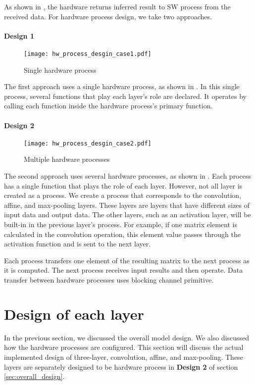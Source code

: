As shown in , the hardware returns inferred result to SW process from the received data. For hardware process design, we take two approaches.

\paragraph{Design 1}

\begin{figure}[tbp]
  \centering
  \texttt{[image: hw\_process\_desgin\_case1.pdf]}
  \caption{Single hardware process}%
  \label{fig:hw_design_1}
\end{figure}

The first approach uses a single hardware process, as shown in . In this single process, several functions that play each layer's role are declared. It operates by calling each function inside the hardware process's primary function.

\paragraph{Design 2}

\begin{figure}[tbp]
  \centering
  \texttt{[image: hw\_process\_desgin\_case2.pdf]}
  \caption{Multiple hardware processes}%
  \label{fig:hw_design_2}
\end{figure}

The second approach uses several hardware processes, as shown in . Each process has a single function that plays the role of each layer. However, not all layer is created as a process. We create a process that corresponds to the convolution, affine, and max-pooling layers. These layers are layers that have different sizes of input data and output data. The other layers, such as an activation layer, will be built-in in the previous layer's process. For example, if one matrix element is calculated in the convolution operation, this element value passes through the activation function and is sent to the next layer.

Each process transfers one element of the resulting matrix to the next process as it is computed. The next process receives input results and then operate. Data transfer between hardware processes uses blocking channel primitive.

\section{Design of each layer}
In the previous section, we discussed the overall model design. We also discussed how the hardware processes are configured. This section will discuss the actual implemented design of three-layer, convolution, affine, and max-pooling. These layers are separately designed to be hardware process in \textbf{Design 2} of section \ref{sec:overall_design}.

